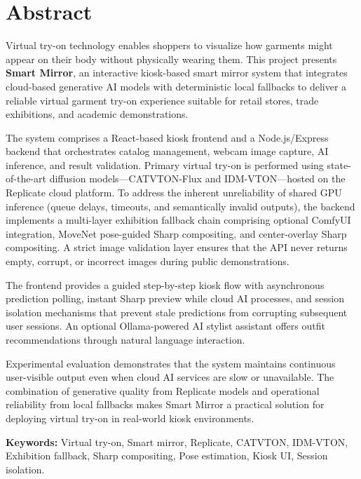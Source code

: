 \chapter*{Abstract}

Virtual try-on technology enables shoppers to visualize how garments might appear on their body without physically wearing them. This project presents \textbf{Smart Mirror}, an interactive kiosk-based smart mirror system that integrates cloud-based generative AI models with deterministic local fallbacks to deliver a reliable virtual garment try-on experience suitable for retail stores, trade exhibitions, and academic demonstrations.

The system comprises a React-based kiosk frontend and a Node.js/Express backend that orchestrates catalog management, webcam image capture, AI inference, and result validation. Primary virtual try-on is performed using state-of-the-art diffusion models---CATVTON-Flux and IDM-VTON---hosted on the Replicate cloud platform. To address the inherent unreliability of shared GPU inference (queue delays, timeouts, and semantically invalid outputs), the backend implements a multi-layer exhibition fallback chain comprising optional ComfyUI integration, MoveNet pose-guided Sharp compositing, and center-overlay Sharp compositing. A strict image validation layer ensures that the API never returns empty, corrupt, or incorrect images during public demonstrations.

The frontend provides a guided step-by-step kiosk flow with asynchronous prediction polling, instant Sharp preview while cloud AI processes, and session isolation mechanisms that prevent stale predictions from corrupting subsequent user sessions. An optional Ollama-powered AI stylist assistant offers outfit recommendations through natural language interaction.

Experimental evaluation demonstrates that the system maintains continuous user-visible output even when cloud AI services are slow or unavailable. The combination of generative quality from Replicate models and operational reliability from local fallbacks makes Smart Mirror a practical solution for deploying virtual try-on in real-world kiosk environments.

\vspace{1cm}
\noindent\textbf{Keywords:} Virtual try-on, Smart mirror, Replicate, CATVTON, IDM-VTON, Exhibition fallback, Sharp compositing, Pose estimation, Kiosk UI, Session isolation.

